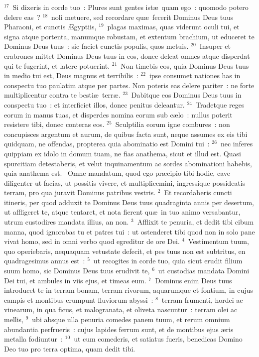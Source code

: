 ${}^{17}$~Si dixeris in corde tuo~: Plures sunt gentes ist\ae\ quam ego~: quomodo potero delere eas~?
${}^{18}$~noli metuere, sed recordare qu\ae\ fecerit Dominus Deus tuus Pharaoni, et cunctis \AE gyptiis,
${}^{19}$~plagas maximas, quas viderunt oculi tui, et signa atque portenta, manumque robustam, et extentum brachium, ut educeret te Dominus Deus tuus~: sic faciet cunctis populis, quos metuis.
${}^{20}$~Insuper et crabrones mittet Dominus Deus tuus in eos, donec deleat omnes atque disperdat qui te fugerint, et latere potuerint.
${}^{21}$~Non timebis eos, quia Dominus Deus tuus in medio tui est, Deus magnus et terribilis~:
${}^{22}$~ipse consumet nationes has in conspectu tuo paulatim atque per partes. Non poteris eas delere pariter~: ne forte multiplicentur contra te besti\ae\ terr\ae .
${}^{23}$~Dabitque eos Dominus Deus tuus in conspectu tuo~: et interficiet illos, donec penitus deleantur.
${}^{24}$~Tradetque reges eorum in manus tuas, et disperdes nomina eorum sub c\ae lo~: nullus poterit resistere tibi, donec conteras eos.
${}^{25}$~Sculptilia eorum igne combures~: non concupisces argentum et aurum, de quibus facta sunt, neque assumes ex eis tibi quidquam, ne offendas, propterea quia abominatio est Domini tui~:
${}^{26}$~nec inferes quippiam ex idolo in domum tuam, ne fias anathema, sicut et illud est. Quasi spurcitiam detestaberis, et velut inquinamentum ac sordes abominationi habebis, quia anathema est.
~Omne mandatum, quod ego pr\ae cipio tibi hodie, cave diligenter ut facias, ut possitis vivere, et multiplicemini, ingressique possideatis terram, pro qua juravit Dominus patribus vestris.
${}^{2}$~Et recordaberis cuncti itineris, per quod adduxit te Dominus Deus tuus quadraginta annis per desertum, ut affligeret te, atque tentaret, et nota fierent qu\ae\ in tuo animo versabantur, utrum custodires mandata illius, an non.
${}^{3}$~Afflixit te penuria, et dedit tibi cibum manna, quod ignorabas tu et patres tui~: ut ostenderet tibi quod non in solo pane vivat homo, sed in omni verbo quod egreditur de ore Dei.
${}^{4}$~Vestimentum tuum, quo operiebaris, nequaquam vetustate defecit, et pes tuus non est subtritus, en quadragesimus annus est~:
${}^{5}$~ut recogites in corde tuo, quia sicut erudit filium suum homo, sic Dominus Deus tuus erudivit te,
${}^{6}$~ut custodias mandata Domini Dei tui, et ambules in viis ejus, et timeas eum.
${}^{7}$~Dominus enim Deus tuus introducet te in terram bonam, terram rivorum, aquarumque et fontium, in cujus campis et montibus erumpunt fluviorum abyssi~:
${}^{8}$~terram frumenti, hordei ac vinearum, in qua ficus, et malogranata, et oliveta nascuntur~: terram olei ac mellis,
${}^{9}$~ubi absque ulla penuria comedes panem tuum, et rerum omnium abundantia perfrueris~: cujus lapides ferrum sunt, et de montibus ejus \ae ris metalla fodiuntur~:
${}^{10}$~ut cum comederis, et satiatus fueris, benedicas Domino Deo tuo pro terra optima, quam dedit tibi.


